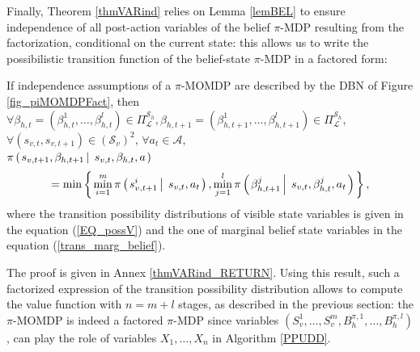Finally, Theorem \ref{thmVARind} relies on Lemma \ref{lemBEL} to ensure
independence of all post-action variables of the belief $\pi$-MDP resulting from the factorization,
conditional on the current state:
this allows us to write the possibilistic transition function of the 
belief-state $\pi$-MDP in a factored form:
\begin{theorem}
\label{thmVARind}
If independence assumptions of a $\pi$-MOMDP are described by the DBN of Figure \ref{fig_piMOMDPFact},
then
$\forall \beta_{h,t}=(\beta^1_{h,t},\ldots,\beta^l_{h,t}) \in \Pi^{\mathcal{S}_h}_{\mathcal{L}}, 
\beta_{h,t+1} = (\beta^1_{h,t+1},\ldots,\beta^l_{h,t+1}) \in  \Pi^{\mathcal{S}_h}_{\mathcal{L}}$, 
$\forall (s_{v,t},s_{v,t+1}) \in (\mathcal{S}_v)^2$, 
$\forall a_t \in \mathcal{A}$, \\
$\pi \left( \left.  s_{v,t+1}, \beta_{h,t+1} \, \right| \left. \, s_{v,t}, \beta_{h,t}, a  \right. \right)$ 
\[  = \displaystyle  \min \left\{ \left.  \min_{i=1}^{m} \pi \left( \left.  s^i_{v,t+1} \, \right| \left. \, s_{v,t}, a_t  \right. \right) ,  \min_{j=1}^{l} \pi \left( \left.  \beta^j_{h,t+1} \, \right| \left. \, s_{v,t}, \beta^j_{h,t}, a_t   \right. \right)  \right. \right\}, \]
where the transition possibility distributions of visible state variables is given in the equation (\ref{EQ_possV})
and the one of marginal belief state variables in the equation (\ref{trans_marg_belief}).
\end{theorem}
The proof is given in Annex \ref{thmVARind_RETURN}.
Using this result, such a factorized expression of the transition possibility distribution
allows to compute the value function with $n=m+l$ stages, 
as described in the previous section:
the $\pi$-MOMDP is indeed a factored $\pi$-MDP
since variables $(S^1_v,\ldots,S^m_v,B^{\pi,1}_h,\ldots,B^{\pi,l}_h)$,
can play the role of variables $X_1,\ldots,X_n$
in Algorithm \ref{PPUDD}.	

